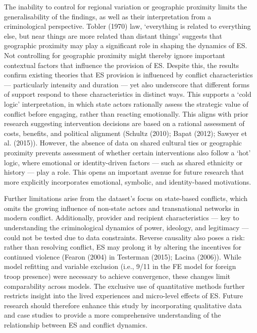 \documentclass[
]{article}
\begin{document}
The inability to control for regional variation or geographic proximity
limits the generalisability of the findings, as well as their
interpretation from a criminological perspective. Tobler (1970) law,
`everything is related to everything else, but near things are more
related than distant things' suggests that geographic proximity may play
a significant role in shaping the dynamics of ES. Not controlling for
geographic proximity might thereby ignore important contextual factors
that influence the provision of ES. Despite this, the results confirm
existing theories that ES provision is influenced by conflict
characteristics --- particularly intensity and duration --- yet also
underscore that different forms of support respond to these
characteristics in distinct ways. This supports a `cold logic'
interpretation, in which state actors rationally assess the strategic
value of conflict before engaging, rather than reacting emotionally.
This aligns with prior research suggesting intervention decisions are
based on a rational assessment of costs, benefits, and political
alignment (Schultz (2010); Bapat (2012); Sawyer et al. (2015)). However,
the absence of data on shared cultural ties or geographic proximity
prevents assessment of whether certain interventions also follow a `hot'
logic, where emotional or identity-driven factors --- such as shared
ethnicity or history --- play a role. This opens an important avenue for
future research that more explicitly incorporates emotional, symbolic,
and identity-based motivations.

Further limitations arise from the dataset's focus on state-based
conflicts, which omits the growing influence of non-state actors and
transnational networks in modern conflict. Additionally, provider and
recipient characteristics --- key to understanding the criminological
dynamics of power, ideology, and legitimacy --- could not be tested due
to data constraints. Reverse causality also poses a risk: rather than
resolving conflict, ES may prolong it by altering the incentives for
continued violence (Fearon (2004) in Testerman (2015); Lacina (2006)).
While model refitting and variable exclusion (i.e., 9/11 in the FE model
for foreign troop presence) were necessary to achieve convergence, these
changes limit comparability across models. The exclusive use of
quantitative methods further restricts insight into the lived
experiences and micro-level effects of ES. Future research should
therefore enhance this study by incorporating qualitative data and case
studies to provide a more comprehensive understanding of the
relationship between ES and conflict dynamics.
\end{document}

